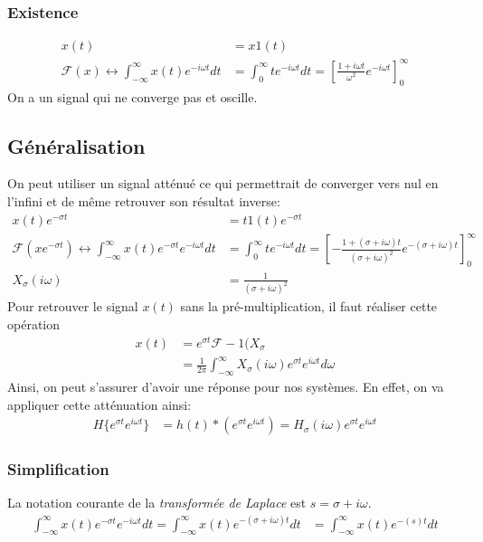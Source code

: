 \documentclass{report}
\begin{document}
\subsubsection{Existence}
\begin{align*}
x(t) &= x 1(t)\\
\mathcal{F} (x) \longleftrightarrow \int_{-\infty}^{\infty} x(t) e^{-i \omega t} dt &= \int_0^{\infty} t e^{-i \omega t} dt = \left[ \frac{1 + i \omega t}{\omega^2} e^{-i \omega t} \right]_0^{\infty}
\end{align*}
On a un signal qui ne converge pas et oscille.

\subsection{Généralisation}
On peut utiliser un signal atténué ce qui permettrait de converger vers nul en l'infini et de même retrouver son résultat inverse:
\begin{align*}
x(t)e^{- \sigma t } &= t 1(t) e^{- \sigma t}\\
\mathcal{F} (x e^{- \sigma t}) \longleftrightarrow \int_{-\infty}^{\infty} x(t) e^{- \sigma t} e^{-i \omega t} dt &= \int_0^{\infty} t e^{-i \omega t} dt = \left[- \frac{1 + (\sigma + i \omega) t}{(\sigma + i \omega)^2} e^{-(\sigma + i \omega )t} \right]_0^{\infty}\\
X_{\sigma} (i \omega) &= \frac{1}{(\sigma + i \omega)^2}
\end{align*}
Pour retrouver le signal $x(t)$ sans la pré-multiplication, il faut réaliser cette opération
\begin{align*}
x(t) &= e^{\sigma t} \mathcal{F}-1 (X_{\sigma}\\
&= \frac{1}{2 \pi }\int_{-\infty}^{\infty} X_{\sigma} (i \omega) e^{\sigma t} e^{i \omega t} d\omega
\end{align*}
Ainsi, on peut s'assurer d'avoir une réponse pour nos systèmes. En effet, on va appliquer cette atténuation ainsi:
\begin{align*}
H\{e^{\sigma t} e^{i \omega t} \} &= h(t) \ast (e^{\sigma t} e^{i \omega t}) = H_{\sigma} (i \omega) e^{\sigma t} e^{i \omega t}
\end{align*}

\subsubsection{Simplification}
La notation courante de la \textit{transformée de Laplace} est $s = \sigma + i \omega$.
\begin{align*}
\int_{-\infty}^{\infty} x(t) e^{- \sigma t} e^{-i \omega t} dt = \int_{-\infty}^{\infty} x(t) e^{-( \sigma + i \omega) t} dt &= \int_{-\infty}^{\infty} x(t) e^{-( s) t} dt
\end{align*}
\end{document}
